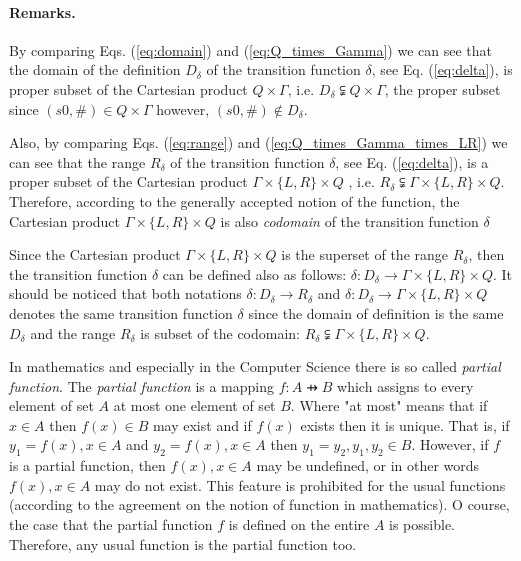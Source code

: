 \documentclass[12pt, a4paper, bibliography=totocnumbered]{report}
\begin{document}
{		\paragraph{Remarks.}{
		
		By comparing Eqs. (\ref{eq:domain}) and (\ref{eq:Q_times_Gamma}) we can see that the domain of the definition $ D_{\delta} $ of the transition function $ \delta $, see Eq. (\ref{eq:delta}), is proper subset of the Cartesian product $ Q \times \Gamma $, i.e. $ D_{\delta} \subsetneqq Q \times \Gamma $, the proper subset since $ (s0, \#)  \in  Q \times \Gamma $ however, $ (s0, \#)  \notin  D_{\delta} $.
		
		Also, by comparing Eqs. (\ref{eq:range}) and (\ref{eq:Q_times_Gamma_times_LR}) we can see that the range $ R_{\delta} $ of the transition function $ \delta $, see Eq. (\ref{eq:delta}), is a proper subset of the Cartesian product $ \Gamma \times \{L,R\} \times Q$ , i.e. $ R_{\delta} \subsetneqq \Gamma \times \{L,R\} \times Q $. Therefore, according to the generally accepted notion of the function, the Cartesian product $ \Gamma \times \{L,R\} \times Q $ is also \emph{codomain} of the transition function $ \delta $
		
		Since the Cartesian product $ \Gamma \times \{L,R\} \times Q $ is the superset of the range $ R_{\delta} $, then the transition function $ \delta $ can be defined also as follows: $ \delta: D_{\delta} \to \Gamma \times \{L,R\} \times Q $. It should be noticed that both notations $ \delta: D_{\delta} \to R_{\delta} $ and $ \delta: D_{\delta} \to \Gamma \times \{L,R\} \times Q $ denotes the same transition function $ \delta $ since the domain of definition is the same $ D_{\delta} $ and the range $ R_{\delta} $ is subset of the codomain: $ R_{\delta} \subsetneqq \Gamma \times \{L,R\} \times Q $.
		
		In mathematics and especially in the Computer Science there is so called \emph{partial function}. The \emph{partial function} is a mapping $ f : A \pfun B $ which assigns to every element of set $ A $ at most one element of set $ B $. Where "at most" means that if $ x \in A $ then $ f(x) \in B $ may exist and if $ f(x) $ exists then it is unique. That is, if $ y_1 = f(x), x \in A $ and $ y_2 = f(x), x \in A $ then $ y_1 = y_2, y_1, y_2 \in B $. However, if $ f $ is a partial function, then $ f(x), x \in A $ may be undefined, or in other words $ f(x), x  \in A $ may do not exist. This feature is prohibited for the usual functions (according to the agreement on the notion of function in mathematics). O course, the case that the partial function $ f $ is defined on the entire $ A $ is possible. Therefore, any usual function is the partial function too.
		
}}
\end{document}
